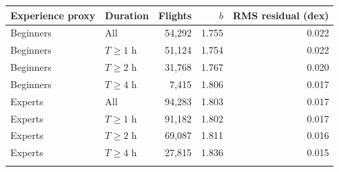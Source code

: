 \begin{tabular}{@{}llrrr@{}}
\toprule
Experience proxy & Duration & Flights & $b$ & RMS residual (dex) \\
\midrule
Beginners & All & 54,292 & 1.755 & 0.022 \\
Beginners & $T\ge1$ h & 51,124 & 1.754 & 0.022 \\
Beginners & $T\ge2$ h & 31,768 & 1.767 & 0.020 \\
Beginners & $T\ge4$ h & 7,415 & 1.806 & 0.017 \\
\addlinespace
Experts & All & 94,283 & 1.803 & 0.017 \\
Experts & $T\ge1$ h & 91,182 & 1.802 & 0.017 \\
Experts & $T\ge2$ h & 69,087 & 1.811 & 0.016 \\
Experts & $T\ge4$ h & 27,815 & 1.836 & 0.015 \\
\addlinespace
\bottomrule
\end{tabular}
